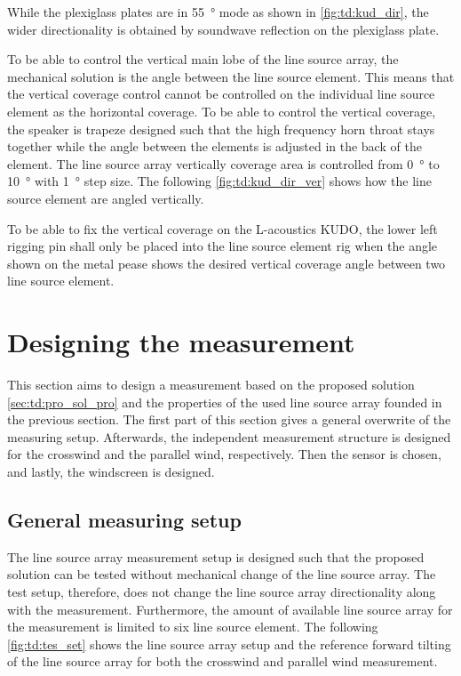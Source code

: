 
While the plexiglass plates are in \SI{55}{\degree} mode as shown in \autoref{fig:td:kud_dir}, the wider directionality is obtained by soundwave reflection on the plexiglass plate.

To be able to control the vertical main lobe of the line source array, the mechanical solution is the angle between the line source element. This means that the vertical coverage control cannot be controlled on the individual line source element as the horizontal coverage. To be able to control the vertical coverage, the speaker is trapeze designed such that the high frequency horn throat stays together while the angle between the elements is adjusted in the back of the element. The line source array vertically coverage area is controlled from \SI{0}{\degree} to \SI{10}{\degree} with \SI{1}{\degree} step size. The following \autoref{fig:td:kud_dir_ver} shows how the line source element are angled vertically.


To be able to fix the vertical coverage on the L-acoustics KUDO, the lower left rigging pin shall only be placed into the line source element rig when the angle shown on the metal pease shows the desired vertical coverage angle between two line source element.  


\section{Designing the measurement}\label{sec:des:des_mes}
This section aims to design a measurement based on the proposed solution \autoref{sec:td:pro_sol_pro} and the properties of the used line source array founded in the previous section. The first part of this section gives a general overwrite of the measuring setup. Afterwards, the independent measurement structure is designed for the crosswind and the parallel wind, respectively. Then the sensor is chosen, and lastly, the windscreen is designed.


\subsection{General measuring setup}\label{sec:pro:test_setup}
The line source array measurement setup is designed such that the proposed solution can be tested without mechanical change of the line source array. The test setup, therefore, does not change the line source array directionality along with the measurement. Furthermore, the amount of available line source array for the measurement is limited to six line source element. The following \autoref{fig:td:tes_set} shows the line source array setup and the reference forward tilting of the line source array for both the crosswind and parallel wind measurement. 


